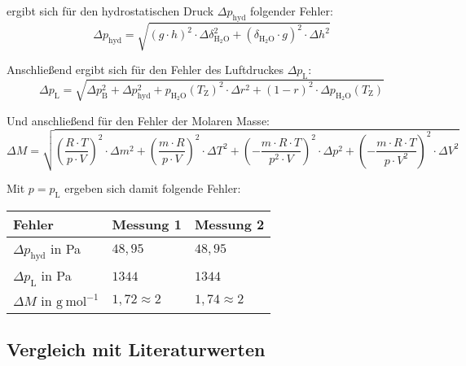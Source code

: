 \documentclass[12pt,a4paper,titlepage,headinclude,bibtotoc]{scrartcl}
\begin{document}
ergibt sich für den hydrostatischen Druck $\Delta p_\mathrm{hyd}$ folgender Fehler:\\

\begin{equation}
\Delta p_\mathrm{hyd} =  \sqrt{(g \cdot h)^2 \cdot \Delta \delta_\mathrm{H_2O}^2 + (\delta_\mathrm{H_2O} \cdot g)^2 \cdot \Delta h^2}
\end{equation}


Anschließend ergibt sich für den Fehler des Luftdruckes $\Delta p_\mathrm{L}$:\\


\begin{equation}
\Delta p_\mathrm{L} = \sqrt{\Delta p_\mathrm{B}^2 + \Delta p_\mathrm{hyd}^2 + p_\mathrm{H_2O}(T_\mathrm{Z})^2 \cdot \Delta r^2 + (1-r)^2 \cdot \Delta p_\mathrm{H_2O}(T_\mathrm{Z})}
\end{equation}

Und anschließend für den Fehler der Molaren Masse:\\

\begin{equation}
\Delta M = \sqrt{\left(\frac{R\cdot T}{p\cdot V}\right)^2 \cdot \Delta m^2 + \left(\frac{m\cdot R}{p\cdot V} \right)^2 \cdot \Delta T^2 + \left(-\frac{m\cdot R\cdot T}{p^2 \cdot V}\right)^2 \cdot \Delta p^2 + \left(-\frac{m \cdot R \cdot T}{p \cdot V^2} \right)^2 \cdot \Delta V^2}
\end{equation}

Mit $p = p_\mathrm{L}$ ergeben sich damit folgende Fehler:\\

\begin{table} [h]
\centering
\begin{tabular}{|p{4 cm}||p{4 cm}|p{4 cm}|}
        \hline
		Fehler & Messung 1 & Messung 2\\
         \hline 
        $\Delta p_\mathrm{hyd}$ in Pa & $48,95$  & $48,95$ \\
        \hline
        $\Delta p_\mathrm{L}   $ in Pa & $1344$  & $1344$ \\
        \hline
        $\Delta M $ in $\mathrm{g{~}mol^{-1}}$ & $1,72 \approx 2$ & $1,74 \approx 2$ \\
        \hline     
\end{tabular}
\end{table}

\subsection{Vergleich mit Literaturwerten}
\end{document}
